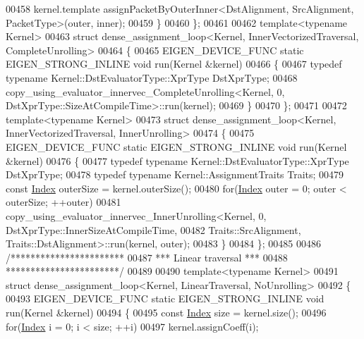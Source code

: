 \begin{DoxyCode}
00458         kernel.template assignPacketByOuterInner<DstAlignment, SrcAlignment, PacketType>(outer, inner);
00459   \}
00460 \};
00461 
00462 \textcolor{keyword}{template}<\textcolor{keyword}{typename} Kernel>
00463 \textcolor{keyword}{struct }dense\_assignment\_loop<Kernel, InnerVectorizedTraversal, CompleteUnrolling>
00464 \{
00465   EIGEN\_DEVICE\_FUNC \textcolor{keyword}{static} EIGEN\_STRONG\_INLINE \textcolor{keywordtype}{void} run(Kernel &kernel)
00466   \{
00467     \textcolor{keyword}{typedef} \textcolor{keyword}{typename} Kernel::DstEvaluatorType::XprType DstXprType;
00468     copy\_using\_evaluator\_innervec\_CompleteUnrolling<Kernel, 0, DstXprType::SizeAtCompileTime>::run(kernel);
00469   \}
00470 \};
00471 
00472 \textcolor{keyword}{template}<\textcolor{keyword}{typename} Kernel>
00473 \textcolor{keyword}{struct }dense\_assignment\_loop<Kernel, InnerVectorizedTraversal, InnerUnrolling>
00474 \{
00475   EIGEN\_DEVICE\_FUNC \textcolor{keyword}{static} EIGEN\_STRONG\_INLINE \textcolor{keywordtype}{void} run(Kernel &kernel)
00476   \{
00477     \textcolor{keyword}{typedef} \textcolor{keyword}{typename} Kernel::DstEvaluatorType::XprType DstXprType;
00478     \textcolor{keyword}{typedef} \textcolor{keyword}{typename} Kernel::AssignmentTraits Traits;
00479     \textcolor{keyword}{const} \hyperlink{namespace_eigen_a62e77e0933482dafde8fe197d9a2cfde}{Index} outerSize = kernel.outerSize();
00480     \textcolor{keywordflow}{for}(\hyperlink{namespace_eigen_a62e77e0933482dafde8fe197d9a2cfde}{Index} outer = 0; outer < outerSize; ++outer)
00481       copy\_using\_evaluator\_innervec\_InnerUnrolling<Kernel, 0, DstXprType::InnerSizeAtCompileTime,
00482                                                    Traits::SrcAlignment, Traits::DstAlignment>::run(kernel,
       outer);
00483   \}
00484 \};
00485 
00486 \textcolor{comment}{/***********************}
00487 \textcolor{comment}{*** Linear traversal ***}
00488 \textcolor{comment}{***********************/}
00489 
00490 \textcolor{keyword}{template}<\textcolor{keyword}{typename} Kernel>
00491 \textcolor{keyword}{struct }dense\_assignment\_loop<Kernel, LinearTraversal, NoUnrolling>
00492 \{
00493   EIGEN\_DEVICE\_FUNC \textcolor{keyword}{static} EIGEN\_STRONG\_INLINE \textcolor{keywordtype}{void} run(Kernel &kernel)
00494   \{
00495     \textcolor{keyword}{const} \hyperlink{namespace_eigen_a62e77e0933482dafde8fe197d9a2cfde}{Index} size = kernel.size();
00496     \textcolor{keywordflow}{for}(\hyperlink{namespace_eigen_a62e77e0933482dafde8fe197d9a2cfde}{Index} i = 0; i < size; ++i)
00497       kernel.assignCoeff(i);

\end{DoxyCode}
